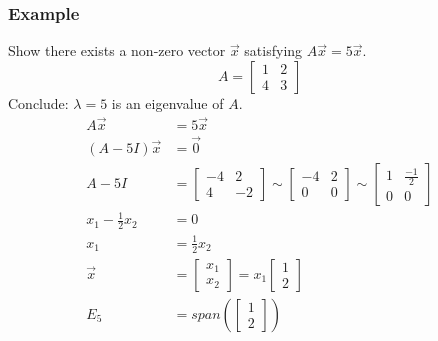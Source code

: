 \documentclass[letterpaper, 12pt]{math}
\begin{document}
\subsubsection*{Example}
Show there exists a non-zero vector \( \vec{x} \) satisfying \( A\vec{x} =
5\vec{x} \).
\[ A = \begin{bmatrix}1 & 2 \\ 4 & 3\end{bmatrix} \]
Conclude: \( \lambda = 5 \) is an eigenvalue of \( A \).
\begin{align*}
  A\vec{x} &= 5\vec{x} \\
  (A-5I)\vec{x} &= \vec{0} \\
  A-5I &= \begin{bmatrix}-4 & 2 \\ 4 & -2\end{bmatrix}
    \sim \begin{bmatrix}-4 & 2 \\ 0 & 0\end{bmatrix}
    \sim \begin{bmatrix}1 & \frac{-1}{2} \\ 0 & 0\end{bmatrix} \\
  x_1-\frac{1}{2}x_2 &= 0 \\
  x_1 &= \frac{1}{2}x_2 \\
  \vec{x} &= \begin{bmatrix}x_1 \\ x_2\end{bmatrix}
    = x_1\begin{bmatrix}1 \\ 2\end{bmatrix} \\
  E_5 &= span\left(\begin{bmatrix}1 \\ 2\end{bmatrix}\right)
\end{align*}
\end{document}
